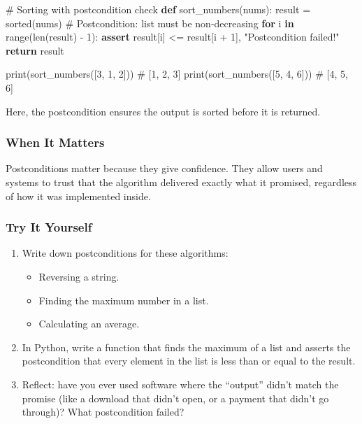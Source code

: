 \documentclass[
  letterpaper,
  DIV=11,
  numbers=noendperiod]{scrreprt}
\newenvironment{Shaded}{\begin{snugshade}}{\end{snugshade}}
\newcommand{\BuiltInTok}[1]{\textcolor[rgb]{0.00,0.23,0.31}{#1}}
\newcommand{\CommentTok}[1]{\textcolor[rgb]{0.37,0.37,0.37}{#1}}
\newcommand{\ControlFlowTok}[1]{\textcolor[rgb]{0.00,0.23,0.31}{\textbf{#1}}}
\newcommand{\DecValTok}[1]{\textcolor[rgb]{0.68,0.00,0.00}{#1}}
\newcommand{\KeywordTok}[1]{\textcolor[rgb]{0.00,0.23,0.31}{\textbf{#1}}}
\newcommand{\NormalTok}[1]{\textcolor[rgb]{0.00,0.23,0.31}{#1}}
\newcommand{\OperatorTok}[1]{\textcolor[rgb]{0.37,0.37,0.37}{#1}}
\newcommand{\StringTok}[1]{\textcolor[rgb]{0.13,0.47,0.30}{#1}}
\providecommand{\tightlist}{%
  \setlength{\itemsep}{0pt}\setlength{\parskip}{0pt}}
\begin{document}
\begin{Shaded}
\begin{Highlighting}[]
\CommentTok{\# Sorting with postcondition check}
\KeywordTok{def}\NormalTok{ sort\_numbers(nums):}
\NormalTok{    result }\OperatorTok{=} \BuiltInTok{sorted}\NormalTok{(nums)}
    \CommentTok{\# Postcondition: list must be non{-}decreasing}
    \ControlFlowTok{for}\NormalTok{ i }\KeywordTok{in} \BuiltInTok{range}\NormalTok{(}\BuiltInTok{len}\NormalTok{(result) }\OperatorTok{{-}} \DecValTok{1}\NormalTok{):}
        \ControlFlowTok{assert}\NormalTok{ result[i] }\OperatorTok{\textless{}=}\NormalTok{ result[i }\OperatorTok{+} \DecValTok{1}\NormalTok{], }\StringTok{"Postcondition failed!"}
    \ControlFlowTok{return}\NormalTok{ result}

\BuiltInTok{print}\NormalTok{(sort\_numbers([}\DecValTok{3}\NormalTok{, }\DecValTok{1}\NormalTok{, }\DecValTok{2}\NormalTok{]))   }\CommentTok{\# [1, 2, 3]}
\BuiltInTok{print}\NormalTok{(sort\_numbers([}\DecValTok{5}\NormalTok{, }\DecValTok{4}\NormalTok{, }\DecValTok{6}\NormalTok{]))   }\CommentTok{\# [4, 5, 6]}
\end{Highlighting}
\end{Shaded}

Here, the postcondition ensures the output is sorted before it is
returned.

\subsubsection{When It Matters}\label{when-it-matters-60}

Postconditions matter because they give confidence. They allow users and
systems to trust that the algorithm delivered exactly what it promised,
regardless of how it was implemented inside.

\subsubsection{Try It Yourself}\label{try-it-yourself-62}

\begin{enumerate}
\def\labelenumi{\arabic{enumi}.}
\item
  Write down postconditions for these algorithms:

  \begin{itemize}
  \tightlist
  \item
    Reversing a string.
  \item
    Finding the maximum number in a list.
  \item
    Calculating an average.
  \end{itemize}
\item
  In Python, write a function that finds the maximum of a list and
  asserts the postcondition that every element in the list is less than
  or equal to the result.
\item
  Reflect: have you ever used software where the ``output'' didn't match
  the promise (like a download that didn't open, or a payment that
  didn't go through)? What postcondition failed?
\end{enumerate}
\end{document}
